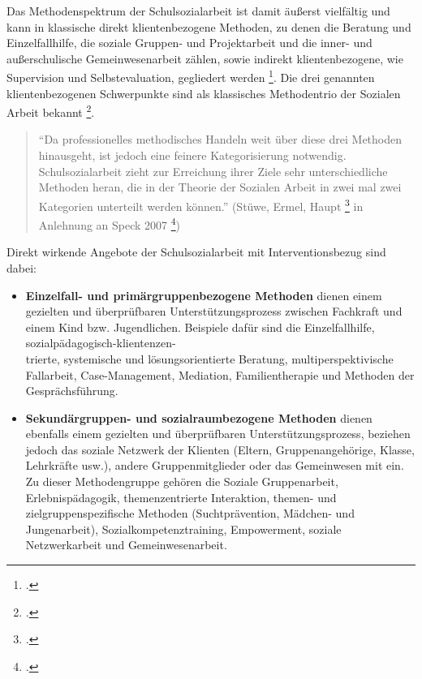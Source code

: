 \noindent
Das Methodenspektrum der Schulsozialarbeit ist damit äußerst vielfältig und kann in klassische direkt klientenbezogene Methoden, zu denen die Beratung und Einzelfallhilfe, die soziale Gruppen- und Projektarbeit und die inner- und außerschulische Gemeinwesenarbeit zählen, sowie indirekt klientenbezogene, wie Supervision und Selbstevaluation, gegliedert werden \footcites[vgl.][22]{Kilb2009}[vgl.][64]{Speck2007}. Die drei genannten klientenbezogenen Schwerpunkte sind als klassisches Methodentrio der Sozialen Arbeit bekannt \footcite[vgl.][95]{Stuewe2015}. 

\begin{quotation}
\noindent
"`Da professionelles methodisches Handeln weit über diese drei Methoden hinausgeht, ist jedoch eine feinere Kategorisierung notwendig. Schulsozialarbeit zieht zur Erreichung ihrer Ziele sehr unterschiedliche Methoden heran, die in der Theorie der Sozialen Arbeit in zwei mal zwei Kategorien unterteilt werden können."' (Stüwe, Ermel, Haupt \footcite[vgl.][95]{Stuewe2015} in Anlehnung an Speck 2007 \footcite[vgl.][64f]{Speck2007})
\end{quotation}

\noindent
Direkt wirkende Angebote der Schulsozialarbeit mit Interventionsbezug sind dabei:\\
\begin{itemize}
	\item \textbf{Einzelfall- und primärgruppenbezogene Methoden} dienen einem gezielten und überprüfbaren Unterstützungsprozess zwischen Fachkraft und einem Kind bzw. Jugendlichen. Beispiele dafür sind die Einzelfallhilfe, sozialpädagogisch-klientenzen-\\
	trierte, systemische und lösungsorientierte Beratung, multiperspektivische Fallarbeit, Case-Management, Mediation, Familientherapie und Methoden der Gesprächsführung. 
	\item \textbf{Sekundärgruppen- und sozialraumbezogene Methoden} dienen ebenfalls einem gezielten und überprüfbaren Unterstützungsprozess, beziehen jedoch das soziale Netzwerk der Klienten (Eltern, Gruppenangehörige, Klasse, Lehrkräfte usw.), andere Gruppenmitglieder oder das Gemeinwesen mit ein. Zu dieser Methodengruppe gehören die Soziale Gruppenarbeit, Erlebnispädagogik, themenzentrierte Interaktion, themen- und zielgruppenspezifische Methoden (Suchtprävention, Mädchen- und Jungenarbeit), Sozialkompetenztraining, Empowerment, soziale Netzwerkarbeit und Gemeinwesenarbeit. 
\end{itemize}

